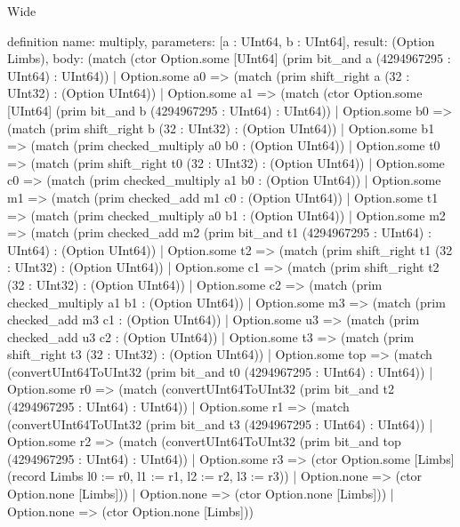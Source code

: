 \begin{lexlean}{Wide}
\begin{semanticmodule}
definition{
  name: multiply,
  parameters: [a : UInt64, b : UInt64],
  result: (Option Limbs),
  body: (match (ctor Option.some [UInt64] (prim bit_and a (4294967295 : UInt64) : UInt64))
    | Option.some a0 => (match (prim shift_right a (32 : UInt32) : (Option UInt64))
      | Option.some a1 => (match (ctor Option.some [UInt64] (prim bit_and b (4294967295 : UInt64) : UInt64))
        | Option.some b0 => (match (prim shift_right b (32 : UInt32) : (Option UInt64))
          | Option.some b1 => (match (prim checked_multiply a0 b0 : (Option UInt64))
            | Option.some t0 => (match (prim shift_right t0 (32 : UInt32) : (Option UInt64))
              | Option.some c0 => (match (prim checked_multiply a1 b0 : (Option UInt64))
                | Option.some m1 => (match (prim checked_add m1 c0 : (Option UInt64))
                  | Option.some t1 => (match (prim checked_multiply a0 b1 : (Option UInt64))
                    | Option.some m2 => (match (prim checked_add m2 (prim bit_and t1 (4294967295 : UInt64) : UInt64) : (Option UInt64))
                      | Option.some t2 => (match (prim shift_right t1 (32 : UInt32) : (Option UInt64))
                        | Option.some c1 => (match (prim shift_right t2 (32 : UInt32) : (Option UInt64))
                          | Option.some c2 => (match (prim checked_multiply a1 b1 : (Option UInt64))
                            | Option.some m3 => (match (prim checked_add m3 c1 : (Option UInt64))
                              | Option.some u3 => (match (prim checked_add u3 c2 : (Option UInt64))
                                | Option.some t3 => (match (prim shift_right t3 (32 : UInt32) : (Option UInt64))
                                  | Option.some top => (match (convertUInt64ToUInt32 (prim bit_and t0 (4294967295 : UInt64) : UInt64))
                                    | Option.some r0 => (match (convertUInt64ToUInt32 (prim bit_and t2 (4294967295 : UInt64) : UInt64))
                                      | Option.some r1 => (match (convertUInt64ToUInt32 (prim bit_and t3 (4294967295 : UInt64) : UInt64))
                                        | Option.some r2 => (match (convertUInt64ToUInt32 (prim bit_and top (4294967295 : UInt64) : UInt64))
                                          | Option.some r3 => (ctor Option.some [Limbs] (record Limbs {l0 := r0, l1 := r1, l2 := r2, l3 := r3}))
                                          | Option.none => (ctor Option.none [Limbs]))
                                        | Option.none => (ctor Option.none [Limbs]))
                                      | Option.none => (ctor Option.none [Limbs]))
}
\end{semanticmodule}
\end{lexlean}
